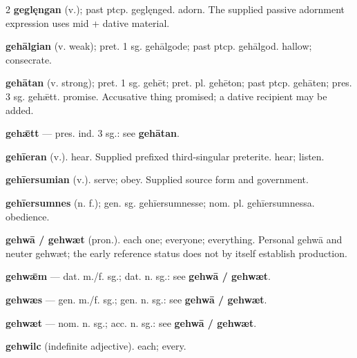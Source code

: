\begin{multicols*}{2}
\textbf{geglęngan} (v.); past ptcp. geglęnged. adorn. The supplied passive adornment expression uses mid + dative material.\par
\textbf{gehālgian} (v. weak); pret. 1 sg. gehālgode; past ptcp. gehālgod. hallow; consecrate.\par
\textbf{gehātan} (v. strong); pret. 1 sg. gehēt; pret. pl. gehēton; past ptcp. gehāten; pres. 3 sg. gehǣtt. promise. Accusative thing promised; a dative recipient may be added.\par
\textbf{gehǣtt} — pres. ind. 3 sg.: see \textbf{gehātan}.\par
\textbf{gehīeran} (v.). hear. Supplied prefixed third-singular preterite. hear; listen.\par
\textbf{gehīersumian} (v.). serve; obey. Supplied source form and government.\par
\textbf{gehīersumnes} (n. f.); gen. sg. gehīersumnesse; nom. pl. gehīersumnessa. obedience.\par
\textbf{gehwā / gehwæt} (pron.). each one; everyone; everything. Personal gehwā and neuter gehwæt; the early reference status does not by itself establish production.\par
\textbf{gehwǣm} — dat. m./f. sg.; dat. n. sg.: see \textbf{gehwā / gehwæt}.\par
\textbf{gehwæs} — gen. m./f. sg.; gen. n. sg.: see \textbf{gehwā / gehwæt}.\par
\textbf{gehwæt} — nom. n. sg.; acc. n. sg.: see \textbf{gehwā / gehwæt}.\par
\textbf{gehwilc} (indefinite adjective). each; every.\par

\end{multicols*}
